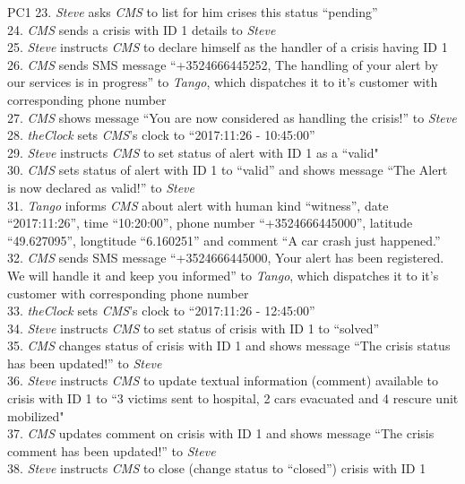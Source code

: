\begin{lyxlist}{PC1}
{23. \emph{Steve} asks \emph{CMS} to list for him crises this status
``pending''\\
24. \emph{CMS} sends a crisis with ID 1 details to \emph{Steve}\\
25. \emph{Steve} instructs \emph{CMS} to declare himself as the handler of a
crisis having ID 1\\
26. \emph{CMS} sends SMS message
``+3524666445252, The handling of your alert by our services is in progress'' to
\emph{Tango}, which dispatches it to it's customer with corresponding phone
number\\
27. \emph{CMS} shows message ``You are now considered as handling the crisis!''
to \emph{Steve}\\
28. \emph{theClock} sets \emph{CMS}'s clock to ``2017:11:26 - 10:45:00''\\
29. \emph{Steve} instructs \emph{CMS} to set status of alert with ID 1 as a
``valid"\\
30. \emph{CMS} sets status of alert with ID 1 to ``valid'' and shows message
``The Alert is now declared as valid!'' to \emph{Steve}\\
31. \emph{Tango} informs \emph{CMS} about alert with human kind ``witness'',
date ``2017:11:26'', time ``10:20:00'', phone number ``+3524666445000'',
latitude ``49.627095'', longtitude ``6.160251'' and comment ``A car crash
just happened.''\\
32. \emph{CMS} sends SMS message
``+3524666445000, Your alert has been registered. We will handle it and keep
you informed'' to \emph{Tango}, which dispatches it to it's customer with
corresponding phone number\\
33. \emph{theClock} sets \emph{CMS}'s clock to ``2017:11:26 - 12:45:00''\\
34. \emph{Steve} instructs \emph{CMS} to set status of crisis with ID 1 to
``solved''\\
35. \emph{CMS} changes status of crisis with ID 1 and shows message ``The
crisis status has been updated!'' to \emph{Steve}\\
36. \emph{Steve} instructs \emph{CMS} to update textual information (comment)
available to crisis with ID 1 to ``3 victims sent to hospital, 2 cars
evacuated and 4 rescure unit mobilized"\\
37. \emph{CMS} updates comment on crisis with ID 1 and shows message ``The
crisis comment has been updated!'' to \emph{Steve}\\
38. \emph{Steve} instructs \emph{CMS} to close (change status to ``closed'')
crisis with ID 1\\
}
\end{lyxlist}
